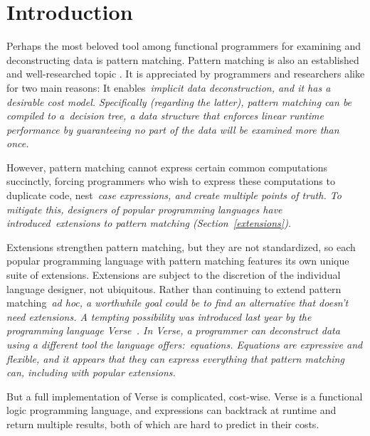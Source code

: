\documentclass[manuscript,screen,12pt, nonacm]{acmart}
\begin{document}
\maketitle

\section{Introduction}

Perhaps the most beloved tool among functional programmers for examining and
deconstructing data is pattern matching. 
Pattern matching is also an established and well-researched topic
\citep{wadler1987views, macqueen1985tree, burton1993pattern, palao1996new,
maranget, bpc}. It is appreciated by programmers and researchers alike for two
main reasons: It enables~\it{implicit} data deconstruction, and it has a
desirable cost model. Specifically (regarding the latter), pattern matching can
be compiled to a~\it{decision tree}, a data structure that enforces linear
runtime performance by guaranteeing no part of the data will be examined more
than once.~\citep{maranget}

However, pattern matching cannot express certain common computations succinctly,
forcing programmers who wish to express these computations to duplicate code,
nest~\it{case} expressions, and create multiple points of truth. To mitigate
this, designers of popular programming languages have introduced~\it{extensions}
to pattern matching (Section~\ref{extensions}). 

Extensions strengthen pattern matching, but they are not standardized, so each
popular programming language with pattern matching features its own unique suite
of extensions. Extensions are subject to the discretion of the individual
language designer, not ubiquitous. Rather than continuing to extend pattern
matching~\it{ad hoc}, a worthwhile goal could be to find an alternative that
doesn't need extensions. A tempting possibility was introduced last year by the
programming language Verse~\citep{verse}. In Verse, a programmer can deconstruct
data using a different tool the language offers:~\it{equations}. Equations are
expressive and flexible, and it appears that they can express everything that
pattern matching can, including with popular extensions. 

But a full implementation of Verse is complicated, cost-wise. Verse is a
functional logic programming language, and expressions can backtrack at runtime
and return multiple results, both of which are hard to predict in their costs. 
\end{document}
